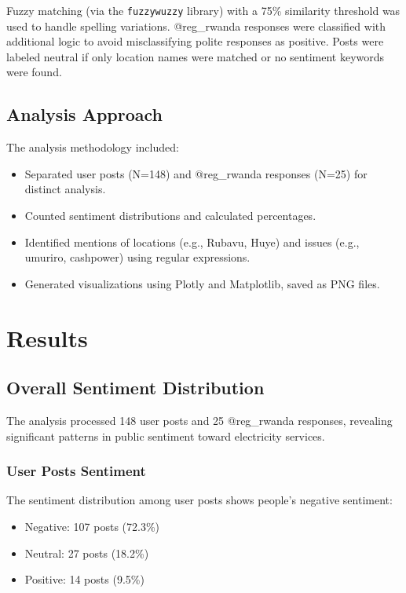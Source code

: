 \documentclass[a4paper,12pt]{article}
\begin{document}
	Fuzzy matching (via the \texttt{fuzzywuzzy} library) with a 75\% similarity threshold was used to handle spelling variations. @reg\_rwanda responses were classified with additional logic to avoid misclassifying polite responses as positive. Posts were labeled neutral if only location names were matched or no sentiment keywords were found.
	
	\subsection{Analysis Approach}
	The analysis methodology included:
	\begin{itemize}
		\item Separated user posts (N=148) and @reg\_rwanda responses (N=25) for distinct analysis.
		\item Counted sentiment distributions and calculated percentages.
		\item Identified mentions of locations (e.g., Rubavu, Huye) and issues (e.g., umuriro, cashpower) using regular expressions.
		\item Generated visualizations using Plotly and Matplotlib, saved as PNG files.
	\end{itemize}
	
	\section{Results}
	
	\subsection{Overall Sentiment Distribution}
	The analysis processed 148 user posts and 25 @reg\_rwanda responses, revealing significant patterns in public sentiment toward electricity services.
	
	\subsubsection{User Posts Sentiment}
	The sentiment distribution among user posts shows people's negative sentiment:
	\begin{itemize}
		\item Negative: 107 posts (72.3\%)
		\item Neutral: 27 posts (18.2\%)
		\item Positive: 14 posts (9.5\%)
	\end{itemize}
	
\end{document}
